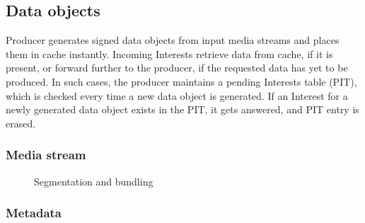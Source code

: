 \documentclass{icn/sig-alternate-2012} %
\begin{document}
\subsection{Data objects}
Producer generates signed data objects from input media streams and places them in cache instantly. Incoming Interests retrieve data from cache, if it is present, or forward further to the producer, if the requested data has yet to be produced. In such cases, the producer maintains a pending Interests table (PIT), which is checked every time a new data object is generated. If an Interest for a newly generated data object exists in the PIT, it gets answered, and PIT entry is erased.

\subsubsection{Media stream}

\begin{figure}[t!]
\centering


\caption{Segmentation and bundling}

\end{figure}

\subsubsection{Metadata}
\end{document}
